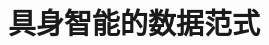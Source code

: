 \setcounter{chapter}{33}

\hypertarget{ux5177ux8eabux667aux80fdux7684ux6570ux636eux8303ux5f0f}{%
\chapter{具身智能的数据范式}\label{ux5177ux8eabux667aux80fdux7684ux6570ux636eux8303ux5f0f}}
